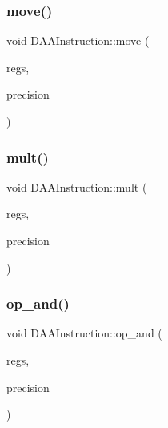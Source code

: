 \mbox{\label{classDAAInstruction_a6288019f03a686afb96918bf43573fc3}} 
\subsubsection{\texorpdfstring{move()}{move()}}
{\footnotesize\ttfamily void D\+A\+A\+Instruction\+::move (\begin{DoxyParamCaption}\item[{\hyperlink{DAAInstruction_8h_af0fae93a861de9cf37988d5673cac523}{reg\+Table} \&}]{regs,  }\item[{\hyperlink{DAAInstruction_8h_a0e8cae02815a5f8adc750122d790b455}{reg\+Precision\+Table} \&}]{precision }\end{DoxyParamCaption})}

\mbox{\label{classDAAInstruction_afa5c8e1e48253021eb5517084c90e9a3}} 
\subsubsection{\texorpdfstring{mult()}{mult()}}
{\footnotesize\ttfamily void D\+A\+A\+Instruction\+::mult (\begin{DoxyParamCaption}\item[{\hyperlink{DAAInstruction_8h_af0fae93a861de9cf37988d5673cac523}{reg\+Table} \&}]{regs,  }\item[{\hyperlink{DAAInstruction_8h_a0e8cae02815a5f8adc750122d790b455}{reg\+Precision\+Table} \&}]{precision }\end{DoxyParamCaption})}

\mbox{\label{classDAAInstruction_a2d1231a596ba8600708564d705453f8f}} 
\subsubsection{\texorpdfstring{op\+\_\+and()}{op\_and()}}
{\footnotesize\ttfamily void D\+A\+A\+Instruction\+::op\+\_\+and (\begin{DoxyParamCaption}\item[{\hyperlink{DAAInstruction_8h_af0fae93a861de9cf37988d5673cac523}{reg\+Table} \&}]{regs,  }\item[{\hyperlink{DAAInstruction_8h_a0e8cae02815a5f8adc750122d790b455}{reg\+Precision\+Table} \&}]{precision }\end{DoxyParamCaption})}

